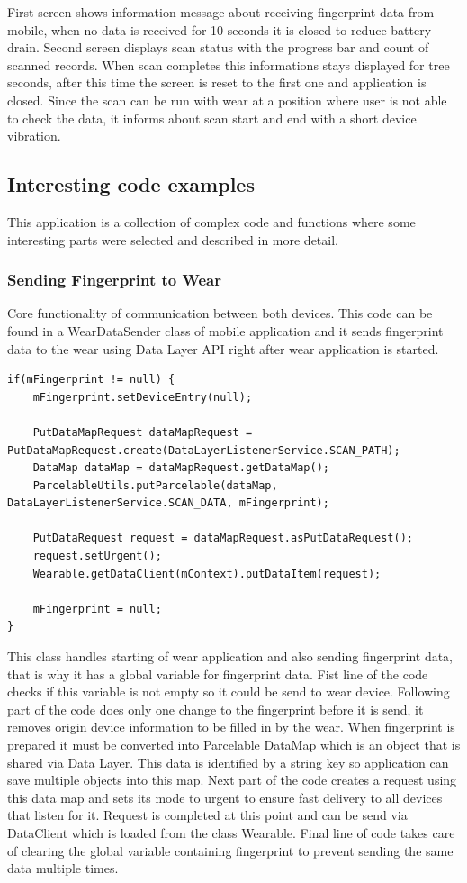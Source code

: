 First screen shows information message about receiving fingerprint data from mobile, when no data is received for 10 seconds it is closed to reduce battery drain. Second screen displays scan status with the progress bar and count of scanned records. When scan completes this informations stays displayed for tree seconds, after this time the screen is reset to the first one and application is closed. Since the scan can be run with wear at a position where user is not able to check the data, it informs about scan start and end with a short device vibration.

\subsection{Interesting code examples}\label{subsec:Interesting code examples}
This application is a collection of complex code and functions where some interesting parts were selected and described in more detail.

\subsubsection{Sending Fingerprint to Wear}\label{subsubsec:SendingFingerprintToWear}
Core functionality of communication between both devices. This code can be found in a WearDataSender class of mobile application and it sends fingerprint data to the wear using Data Layer API right after wear application is started.

\begin{lstlisting}[caption=Sending Fingerprint to Wear]
if(mFingerprint != null) {
	mFingerprint.setDeviceEntry(null);
	
	PutDataMapRequest dataMapRequest = PutDataMapRequest.create(DataLayerListenerService.SCAN_PATH);
	DataMap dataMap = dataMapRequest.getDataMap();
	ParcelableUtils.putParcelable(dataMap, DataLayerListenerService.SCAN_DATA, mFingerprint);
	
	PutDataRequest request = dataMapRequest.asPutDataRequest();
	request.setUrgent();
	Wearable.getDataClient(mContext).putDataItem(request);
	
	mFingerprint = null;
}
\end{lstlisting}

This class handles starting of wear application and also sending fingerprint data, that is why it has a global variable for fingerprint data. Fist line of the code checks if this variable is not empty so it could be send to wear device. Following part of the code does only one change to the fingerprint before it is send, it removes origin device information to be filled in by the wear. When fingerprint is prepared it must be converted into Parcelable DataMap which is an object that is shared via Data Layer. This data is identified by a string key so application can save multiple objects into this map. Next part of the code creates a request using this data map and sets its mode to urgent to ensure fast delivery to all devices that listen for it. Request is completed at this point and can be send via DataClient which is loaded from the class Wearable. Final line of code takes care of clearing the global variable containing fingerprint to prevent sending the same data multiple times.

